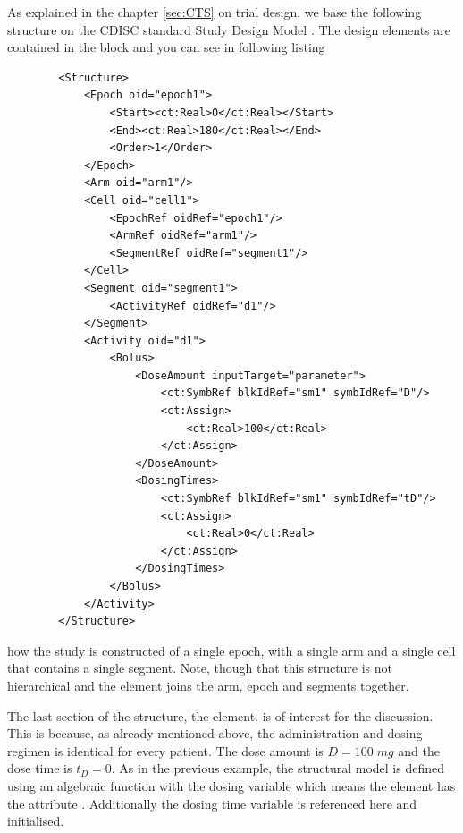 As explained in the chapter \ref{sec:CTS} on trial design, we base the following 
structure on the CDISC standard Study Design Model \cite{CDISC:2011a}. 
The design elements are contained in the  block and you can see 
in following listing 
\lstset{language=XML}
\begin{lstlisting}
        <Structure>
            <Epoch oid="epoch1">
                <Start><ct:Real>0</ct:Real></Start>
                <End><ct:Real>180</ct:Real></End>
                <Order>1</Order>
            </Epoch>
            <Arm oid="arm1"/>
            <Cell oid="cell1">
                <EpochRef oidRef="epoch1"/>
                <ArmRef oidRef="arm1"/>
                <SegmentRef oidRef="segment1"/>
            </Cell>
            <Segment oid="segment1">
                <ActivityRef oidRef="d1"/>
            </Segment>
            <Activity oid="d1">
                <Bolus>
                    <DoseAmount inputTarget="parameter">
                        <ct:SymbRef blkIdRef="sm1" symbIdRef="D"/>
                        <ct:Assign>
                            <ct:Real>100</ct:Real>
                        </ct:Assign>
                    </DoseAmount>
                    <DosingTimes>
                        <ct:SymbRef blkIdRef="sm1" symbIdRef="tD"/>
                        <ct:Assign>
                            <ct:Real>0</ct:Real>
                        </ct:Assign>
                    </DosingTimes>
                </Bolus>
            </Activity>
        </Structure>
\end{lstlisting}

how the study is constructed of a single epoch, 
with a single arm and a single cell that contains a single segment. Note, though 
that this structure is not hierarchical and the  element joins the arm, 
epoch and segments together. 

The last section of the structure, the  element, is of interest for 
the discussion. This is because, as already mentioned above, the administration
and dosing regimen is identical for every patient. The dose amount is $D=100\; mg$ 
and the dose time is $t_D=0$.
As in the previous example, the structural model is defined using an algebraic
function with the dosing variable  which means the  element
has the attribute . Additionally the dosing time variable  is
referenced here and initialised. 



